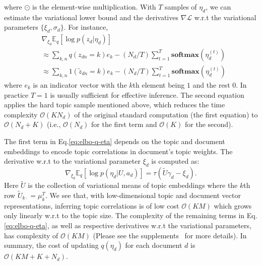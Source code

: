 \documentclass[sigconf]{acmart}
\renewcommand*{\bm}[1]{#1}%
\begin{document}
where $\odot$ is the element-wise multiplication.
With $T$ samples of $\bm{\eta}_d$, we can estimate the variational lower bound and the derivatives $\nabla\mathcal{L}$ w.r.t the variational parameters $\{\bm{\xi}_d, \bm{\sigma}_d\}$. For instance, 
\begin{equation}
\begin{split}
&\nabla_{\bm{\xi}_d} \mathbb{E}_q \left[\log p(\bm{z}_{d} | \bm{\eta}_d) \right] \\
&\approx \sum\nolimits_{k,n}q(z_{dn}=k) \bm{e}_k - (N_d/T)\sum\nolimits_{t=1}^{T}\textbf{softmax}\left(\bm{\eta}_{d}^{(t)}\right) \\
&\approx \sum\nolimits_{k,n}\bm{1}(\tilde{z}_{dn}=k) \bm{e}_k - (N_d/T)\sum\nolimits_{t=1}^{T}\textbf{softmax}\left(\bm{\eta}_{d}^{(t)}\right)
\end{split}
\label{eq:vi-p-zdn}
\end{equation}
where $\bm{e}_k$ is an indicator vector with the $k$th element being $1$ and the rest $0$. In practice $T=1$ is usually sufficient for effective inference. The second equation applies the hard topic sample mentioned above, which reduces the time complexity $\mathcal{O}(KN_d)$ of the original standard computation (the first equation) to $\mathcal{O}(N_d+K)$ (i.e., $\mathcal{O}(N_d)$ for the first term and $\mathcal{O}(K)$ for the second).

The first term in Eq.\eqref{eq:elbo-q-eta} depends on the topic and document embeddings to encode topic correlations in document's topic weights. The derivative w.r.t to the variational parameter $\bm{\xi}_d$ is computed as:
\begin{equation}
\nabla_{\bm{\xi}_d}\mathbb{E}_q\left[\log p(\bm{\eta}_d | \bm{U}, \bm{a}_d)\right] = \tau(\tilde{\bm{U}} \bm{\gamma}_d - \bm{\xi}_d).
\label{eq:vi-p-eta}
\end{equation}
Here $\tilde{\bm{U}}$ is the collection of variational means of topic embeddings where the $k$th row $\tilde{\bm{U}}_{k\cdot} = \bm{\mu}_k^T$. We see that, with low-dimensional topic and document vector representations, inferring topic correlations is of low cost $\mathcal{O}(KM)$ which grows only linearly w.r.t to the topic size.
%
The complexity of the remaining terms in Eq.\eqref{eq:elbo-q-eta}, as well as respective derivatives w.r.t the variational parameters, has complexity of $\mathcal{O}(KM)$ (Please see the supplements~\cite{supplement} for more details). In summary, the cost of updating $q(\bm{\eta}_d)$ for each document $d$ is $\mathcal{O}(KM+K+N_d)$. 
\end{document}

